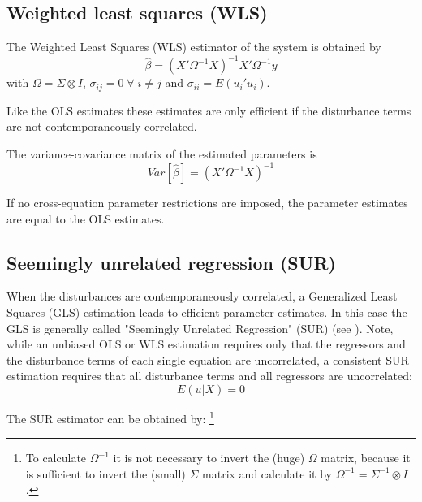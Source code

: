 \subsection{Weighted least squares (WLS)}

The Weighted Least Squares (WLS) estimator of the system 
is obtained by
\begin{equation}
   \widehat{\beta} = \left( X' \Omega^{-1} X \right)^{-1} X' \Omega^{-1} y
\end{equation}
with $\Omega = \Sigma \otimes I$, 
$\sigma_{ij} = 0 \; \forall \; i \neq j$ and
$\sigma_{ii} = E \left( u_i' u_i \right)$.

Like the OLS estimates these estimates are only efficient 
if the disturbance terms are not contemporaneously correlated.

The variance-covariance matrix of the estimated parameters is
\begin{equation}
   Var \left[ \widehat{\beta} \right] = \left( X' \Omega^{-1} X \right)^{-1}
\end{equation}

If no cross-equation parameter restrictions are imposed, 
the parameter estimates are equal to the OLS estimates.

\subsection{Seemingly unrelated regression (SUR)}

When the disturbances are contemporaneously correlated, a Generalized 
Least Squares (GLS) estimation leads to efficient parameter estimates.
In this case the GLS is generally called "Seemingly Unrelated Regression" 
(SUR) (see \citealp{zellner62}). 
Note, while an unbiased OLS or WLS estimation requires only that 
the regressors and the disturbance terms of each single 
equation are uncorrelated,
a consistent SUR estimation requires that all disturbance terms and all 
regressors are uncorrelated:
\begin{equation}
   E \left( u | X \right) = 0
\end{equation}

The SUR estimator can be obtained by:%
\footnote{To calculate $\Omega^{-1}$ it is not necessary to invert 
the (huge) $\Omega$ matrix, 
because it is sufficient to invert the (small) $\Sigma$ matrix and
calculate it by $\Omega^{-1} = \Sigma^{-1} \otimes I$.}

